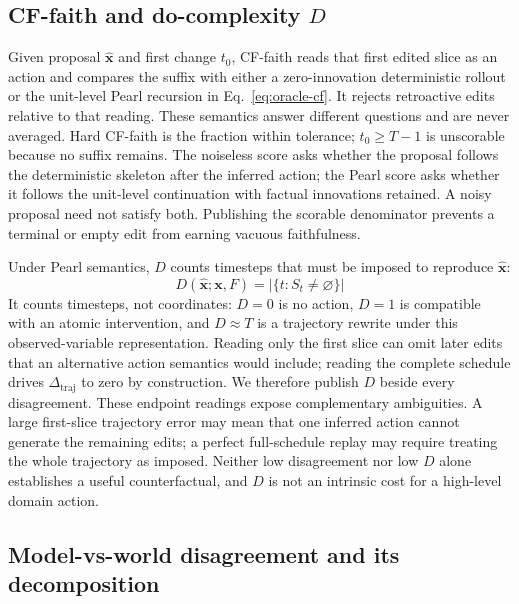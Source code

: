 \documentclass{article}
\newcommand{\bx}{\mathbf{x}}
\newcommand{\dotraj}{\Delta_{\mathrm{traj}}}
\begin{document}
\subsection{CF-faith and do-complexity $D$}

Given proposal $\hat{\bx}$ and first change $t_0$, CF-faith reads that first edited slice as an action and compares the suffix with either a zero-innovation deterministic rollout or the unit-level Pearl recursion in Eq.~\eqref{eq:oracle-cf}. It rejects retroactive edits relative to that reading. These semantics answer different questions and are never averaged. Hard CF-faith is the fraction within tolerance; $t_0\geq T-1$ is unscorable because no suffix remains. The noiseless score asks whether the proposal follows the deterministic skeleton after the inferred action; the Pearl score asks whether it follows the unit-level continuation with factual innovations retained. A noisy proposal need not satisfy both. Publishing the scorable denominator prevents a terminal or empty edit from earning vacuous faithfulness.

Under Pearl semantics, $D$ counts timesteps that must be imposed to reproduce $\hat{\bx}$:
\begin{equation}
  D(\hat{\bx};\bx,F)
  =\left|\{t:S_t\neq\varnothing\}\right|
  \label{eq:do-complexity}
\end{equation}
It counts timesteps, not coordinates: $D=0$ is no action, $D=1$ is compatible with an atomic intervention, and $D\approx T$ is a trajectory rewrite under this observed-variable representation. Reading only the first slice can omit later edits that an alternative action semantics would include; reading the complete schedule drives $\dotraj$ to zero by construction. We therefore publish $D$ beside every disagreement. These endpoint readings expose complementary ambiguities. A large first-slice trajectory error may mean that one inferred action cannot generate the remaining edits; a perfect full-schedule replay may require treating the whole trajectory as imposed. Neither low disagreement nor low $D$ alone establishes a useful counterfactual, and $D$ is not an intrinsic cost for a high-level domain action.

\subsection{Model-vs-world disagreement and its decomposition}
\end{document}
